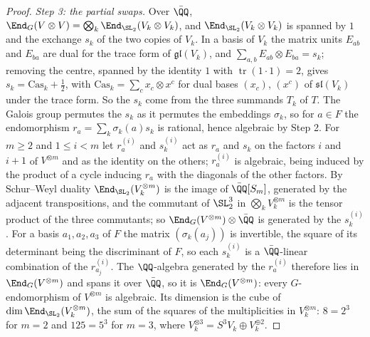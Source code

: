 \begin{proof}
\emph{Step 3: the partial swaps.} Over $\bar{\QQ}$,
$\End_{G}(V\otimes V)=\bigotimes_{k}\End_{\SL_{2}}(V_{k}\otimes V_{k})$, and
$\End_{\SL_{2}}(V_{k}\otimes V_{k})$ is spanned by $1$ and the exchange $s_{k}$
of the two copies of $V_{k}$. In a basis of $V_{k}$ the matrix units
$E_{ab}$ and $E_{ba}$ are dual for the trace form of $\mathfrak{gl}(V_{k})$,
and $\sum_{a,b}E_{ab}\otimes E_{ba}=s_{k}$; removing the centre, spanned by the
identity $1$ with $\operatorname{tr}(1\cdot1)=2$, gives
$s_{k}=\mathrm{Cas}_{k}+\frac12$, with $\mathrm{Cas}_{k}=\sum_{c}x_{c}\otimes
x^{c}$ for dual bases $(x_{c})$, $(x^{c})$ of $\mathfrak{sl}(V_{k})$ under the
trace form. So the $s_{k}$ come from the three summands $T_{k}$ of $T$. The Galois group permutes the $s_{k}$ as it
permutes the embeddings $\sigma_{k}$, so for $a\in F$ the endomorphism
$r_{a}=\sum_{k}\sigma_{k}(a)s_{k}$ is rational, hence algebraic by Step 2. For
$m\ge2$ and $1\le i<m$ let $r_{a}^{(i)}$ and $s_{k}^{(i)}$ act as $r_{a}$ and
$s_{k}$ on the factors $i$ and $i+1$ of $V^{\otimes m}$ and as the identity on
the others; $r_{a}^{(i)}$ is algebraic, being induced by the product of a cycle
inducing $r_{a}$ with the diagonals of the other factors. By Schur--Weyl
duality $\End_{\SL_{2}}(V_{k}^{\otimes m})$ is the image of
$\bar{\QQ}[S_{m}]$, generated by the adjacent transpositions, and the
commutant of $\SL_{2}^{3}$ in $\bigotimes_{k}V_{k}^{\otimes m}$ is the tensor
product of the three commutants; so $\End_{G}(V^{\otimes m})\otimes\bar{\QQ}$
is generated by the $s_{k}^{(i)}$. For a basis $a_{1},a_{2},a_{3}$ of $F$ the
matrix $(\sigma_{k}(a_{j}))$ is invertible, the square of its determinant being
the discriminant of $F$, so each $s_{k}^{(i)}$ is a $\bar{\QQ}$-linear
combination of the $r_{a_{j}}^{(i)}$. The $\QQ$-algebra generated by the
$r_{a}^{(i)}$ therefore lies in $\End_{G}(V^{\otimes m})$ and spans it over
$\bar{\QQ}$, so it is $\End_{G}(V^{\otimes m})$: every $G$-endomorphism of
$V^{\otimes m}$ is algebraic. Its dimension is the cube of
$\dim\End_{\SL_{2}}(V_{k}^{\otimes m})$, the sum of the squares of the
multiplicities in $V_{k}^{\otimes m}$: $8=2^{3}$ for $m=2$ and $125=5^{3}$ for
$m=3$, where $V_{k}^{\otimes3}=S^{3}V_{k}\oplus V_{k}^{\oplus2}$.


\end{proof}
